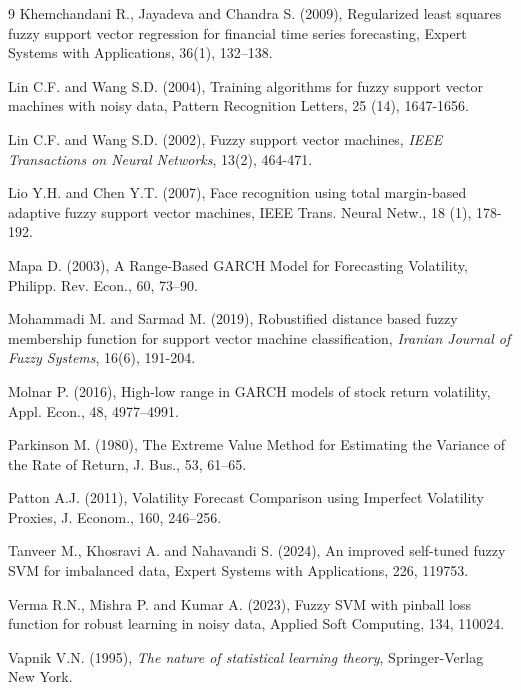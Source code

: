 \documentclass[twoside]{article}
\begin{document}
\begin{thebibliography}{9}
	Khemchandani R., Jayadeva and Chandra S. (2009), Regularized least squares fuzzy support vector regression for financial time series forecasting, Expert Systems with Applications, 36(1), 132–138.
	
	Lin C.F. and Wang S.D. (2004), Training algorithms for fuzzy support vector machines with noisy data, Pattern Recognition Letters, 25 (14), 1647-1656.
	
	Lin C.F. and Wang S.D. (2002), Fuzzy support vector machines, {\it IEEE Transactions on Neural Networks}, 13(2), 464-471.
	
	Lio Y.H. and Chen Y.T. (2007), Face recognition using total margin-based adaptive fuzzy support vector machines, IEEE Trans. Neural Netw., 18 (1), 178-192.
	
	Mapa D. (2003), A Range-Based GARCH Model for Forecasting Volatility, Philipp. Rev. Econ., 60, 73--90.
	
	Mohammadi M. and Sarmad M. (2019), Robustified distance based fuzzy membership function for support vector machine classification, {\it Iranian Journal of Fuzzy Systems}, 16(6), 191-204.
	
	Molnar P. (2016), High-low range in GARCH models of stock return volatility, Appl. Econ., 48, 4977--4991.
	
	Parkinson M. (1980), The Extreme Value Method for Estimating the Variance of the Rate of Return, J. Bus., 53, 61--65.
	
	Patton A.J. (2011), Volatility Forecast Comparison using Imperfect Volatility Proxies, J. Econom., 160, 246--256.
	
	Tanveer M., Khosravi A. and Nahavandi S. (2024), An improved self-tuned fuzzy SVM for imbalanced data, Expert Systems with Applications, 226, 119753.
	
	Verma R.N., Mishra P. and Kumar A. (2023), Fuzzy SVM with pinball loss function for robust learning in noisy data, Applied Soft Computing, 134, 110024.
	
	Vapnik V.N. (1995), {\it The nature of statistical learning theory}, Springer-Verlag New York.
	

\end{thebibliography}
\end{document}
